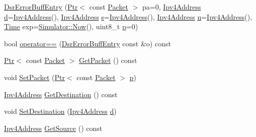 \begin{DoxyCompactItemize}
\item 
\hyperlink{classns3_1_1dsr_1_1DsrErrorBuffEntry_a762ca881526479d8653e0c920bce4c17}{Dsr\+Error\+Buff\+Entry} (\hyperlink{classns3_1_1Ptr}{Ptr}$<$ const \hyperlink{classns3_1_1Packet}{Packet} $>$ pa=0, \hyperlink{classns3_1_1Ipv4Address}{Ipv4\+Address} \hyperlink{lte__pathloss_8m_a1aabac6d068eef6a7bad3fdf50a05cc8}{d}=\hyperlink{classns3_1_1Ipv4Address}{Ipv4\+Address}(), \hyperlink{classns3_1_1Ipv4Address}{Ipv4\+Address} \hyperlink{generate__test__data__lte__sinr_8m_ad83eeb3a142285d1243a08c6b7026df8}{s}=\hyperlink{classns3_1_1Ipv4Address}{Ipv4\+Address}(), \hyperlink{classns3_1_1Ipv4Address}{Ipv4\+Address} \hyperlink{lte__link__budget__x2__handover__measures_8m_abdb05bc5a064cf642a06c83b3392f148}{n}=\hyperlink{classns3_1_1Ipv4Address}{Ipv4\+Address}(), \hyperlink{classns3_1_1Time}{Time} exp=\hyperlink{classns3_1_1Simulator_ac3178fa975b419f7875e7105be122800}{Simulator\+::\+Now}(), uint8\+\_\+t \hyperlink{lte__link__budget__x2__handover__measures_8m_ac9de518908a968428863f829398a4e62}{p}=0)
\item 
bool \hyperlink{classns3_1_1dsr_1_1DsrErrorBuffEntry_abfacc4c2c9635555e9cccdad3d294bed}{operator==} (\hyperlink{classns3_1_1dsr_1_1DsrErrorBuffEntry}{Dsr\+Error\+Buff\+Entry} const \&o) const 
\item 
\hyperlink{classns3_1_1Ptr}{Ptr}$<$ const \hyperlink{classns3_1_1Packet}{Packet} $>$ \hyperlink{classns3_1_1dsr_1_1DsrErrorBuffEntry_af0960a1cc244125321b4aaeb54340137}{Get\+Packet} () const 
\item 
void \hyperlink{classns3_1_1dsr_1_1DsrErrorBuffEntry_ac9fe2b52c3ff640dd69df9d6f7fac2f5}{Set\+Packet} (\hyperlink{classns3_1_1Ptr}{Ptr}$<$ const \hyperlink{classns3_1_1Packet}{Packet} $>$ \hyperlink{lte__link__budget__x2__handover__measures_8m_ac9de518908a968428863f829398a4e62}{p})
\item 
\hyperlink{classns3_1_1Ipv4Address}{Ipv4\+Address} \hyperlink{classns3_1_1dsr_1_1DsrErrorBuffEntry_a1cb27ae68fd22d0e5f6f1fc53f174dba}{Get\+Destination} () const 
\item 
void \hyperlink{classns3_1_1dsr_1_1DsrErrorBuffEntry_a200e1042a34312656fbd35281b6dd135}{Set\+Destination} (\hyperlink{classns3_1_1Ipv4Address}{Ipv4\+Address} \hyperlink{lte__pathloss_8m_a1aabac6d068eef6a7bad3fdf50a05cc8}{d})
\item 
\hyperlink{classns3_1_1Ipv4Address}{Ipv4\+Address} \hyperlink{classns3_1_1dsr_1_1DsrErrorBuffEntry_a4080124792aa33137386cc149442420c}{Get\+Source} () const 

\end{DoxyCompactItemize}
